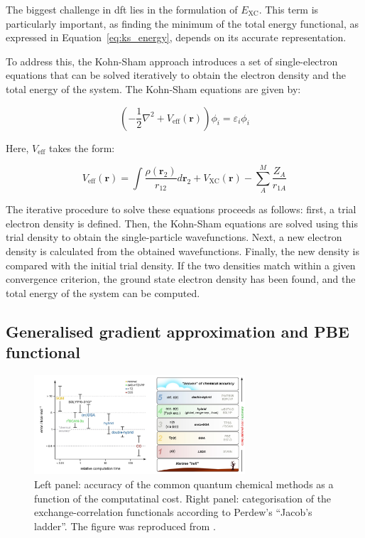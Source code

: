 The biggest challenge in \ac{dft} lies in the formulation of $E_{\text{XC}}$. This term is particularly important, as finding the minimum of the total energy functional, as expressed in Equation~\ref{eq:ks_energy}, depends on its accurate representation.

To address this, the Kohn-Sham approach introduces a set of single-electron equations that can be solved iteratively to obtain the electron density and the total energy of the system. The Kohn-Sham equations are given by:

\begin{equation}
    \left( -\frac{1}{2} \nabla^2 + V_{\text{eff}}(\mathbf{r}) \right) \phi_i = \varepsilon_i \phi_i
    \label{eq:ks_equations}
\end{equation}

Here, $V_{\text{eff}}$ takes the form:

\begin{equation}
    V_{\text{eff}}(\mathbf{r}) = \int \frac{\rho(\mathbf{r}_2)}{r_{12}} d\mathbf{r}_2 + V_{\text{XC}}(\mathbf{r}) - \sum_{A}^{M} \frac{Z_A}{r_{1A}}
    \label{eq:v_eff}
\end{equation}

The iterative procedure to solve these equations proceeds as follows: first, a trial electron density is defined. Then, the Kohn-Sham equations are solved using this trial density to obtain the single-particle wavefunctions. Next, a new electron density is calculated from the obtained wavefunctions. Finally, the new density is compared with the initial trial density. If the two densities match within a given convergence criterion, the ground state electron density has been found, and the total energy of the system can be computed.



\subsection{Generalised gradient approximation and PBE functional}

\begin{figure}[t!]
    \centering
    \includegraphics[width=0.7\textwidth]{Figures/2_Theory/theory_jacobs_ladder.png}
    \caption{Left panel: accuracy of the common quantum chemical methods as a function of the computatinal cost. Right panel: categorisation of the exchange-correlation functionals according to Perdew's ``Jacob's ladder''. The figure was reproduced from \citep{burschBestPracticeDFTProtocols2022}.}
    \label{fig:jacobs_ladder}
\end{figure}

